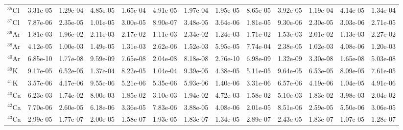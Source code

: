 \begin{landscape}
\begin{table}
\begin{tabular}{l|cc|cc|cc|cc|cc|cc}
$^{35}$Cl & 3.31e-05 & 1.29e-04 & 4.85e-05 & 1.65e-04 & 4.91e-05 & 1.97e-04 & 1.95e-05 & 8.65e-05 & 3.92e-05 & 1.19e-04 & 4.14e-05 & 1.34e-04\\
$^{37}$Cl & 7.87e-06 & 2.35e-05 & 1.01e-05 & 3.00e-05 & 8.90e-07 & 3.48e-05 & 3.64e-06 & 1.81e-05 & 9.30e-06 & 2.30e-05 & 3.03e-06 & 2.71e-05\\
$^{36}$Ar & 1.81e-03 & 1.96e-02 & 2.11e-03 & 2.17e-02 & 1.11e-03 & 2.34e-02 & 1.24e-03 & 1.71e-02 & 1.53e-03 & 2.01e-02 & 1.13e-03 & 2.27e-02\\
$^{38}$Ar & 4.12e-05 & 1.00e-03 & 1.49e-05 & 1.31e-03 & 2.62e-06 & 1.52e-03 & 5.95e-05 & 7.74e-04 & 2.38e-05 & 1.02e-03 & 4.08e-06 & 1.20e-03\\
$^{40}$Ar & 6.85e-10 & 1.77e-08 & 9.59e-09 & 7.65e-08 & 2.04e-08 & 8.18e-08 & 2.76e-10 & 6.98e-09 & 1.32e-09 & 3.30e-08 & 1.65e-08 & 5.03e-08\\
$^{39}$K & 9.17e-05 & 6.52e-05 & 1.37e-04 & 8.22e-05 & 1.04e-04 & 9.39e-05 & 4.38e-05 & 5.11e-05 & 9.64e-05 & 6.53e-05 & 8.09e-05 & 7.61e-05\\
$^{41}$K & 3.57e-06 & 4.17e-06 & 9.55e-06 & 5.21e-06 & 5.35e-06 & 5.93e-06 & 1.40e-06 & 3.31e-06 & 6.57e-06 & 4.19e-06 & 1.04e-05 & 4.91e-06\\
$^{40}$Ca & 6.23e-03 & 1.74e-02 & 8.00e-03 & 1.85e-02 & 3.10e-03 & 1.94e-02 & 4.72e-03 & 1.58e-02 & 5.10e-03 & 1.83e-02 & 3.98e-03 & 2.04e-02\\
$^{42}$Ca & 7.70e-06 & 2.60e-05 & 6.18e-06 & 3.36e-05 & 7.83e-06 & 3.88e-05 & 4.08e-06 & 2.01e-05 & 8.51e-06 & 2.59e-05 & 5.50e-06 & 3.06e-05\\
$^{43}$Ca & 2.99e-05 & 1.77e-07 & 2.00e-05 & 1.58e-07 & 1.93e-05 & 1.83e-07 & 1.34e-05 & 2.89e-07 & 2.43e-05 & 1.83e-07 & 1.07e-05 & 1.28e-07\\
\hline
\end{tabular}
\end{table}
\end{landscape}

